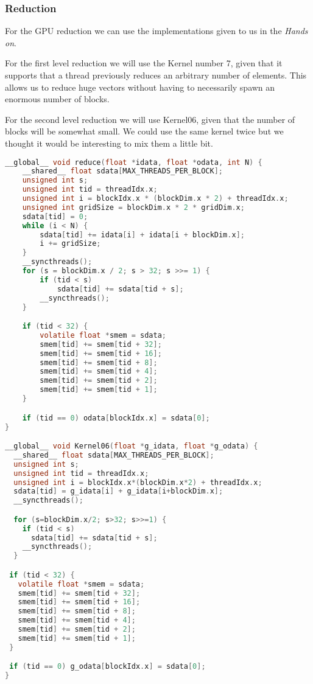 \documentclass[a4paper, 10pt]{article}
\begin{document}
\subsubsection{Reduction}

For the GPU reduction we can use the implementations given to us in the \textit{Hands on}. 

For the first level reduction we will use the Kernel number 7, given that it supports that a thread previously reduces an arbitrary number of elements. This allows us to reduce huge vectors without having to necessarily spawn an enormous number of blocks.

For the second level reduction we will use Kernel06, given that the number of blocks will be somewhat small. We could use the same kernel twice but we thought it would be interesting to mix them a little bit.

\begin{lstlisting}[language=c, caption={Reduction kernel}]
__global__ void reduce(float *idata, float *odata, int N) {
    __shared__ float sdata[MAX_THREADS_PER_BLOCK];
    unsigned int s;
    unsigned int tid = threadIdx.x;
    unsigned int i = blockIdx.x * (blockDim.x * 2) + threadIdx.x;
    unsigned int gridSize = blockDim.x * 2 * gridDim.x;
    sdata[tid] = 0;
    while (i < N) {
        sdata[tid] += idata[i] + idata[i + blockDim.x];
        i += gridSize;
    }
    __syncthreads();
    for (s = blockDim.x / 2; s > 32; s >>= 1) {
        if (tid < s)
            sdata[tid] += sdata[tid + s];
        __syncthreads();
    }

    if (tid < 32) {
        volatile float *smem = sdata;
        smem[tid] += smem[tid + 32];
        smem[tid] += smem[tid + 16];
        smem[tid] += smem[tid + 8];
        smem[tid] += smem[tid + 4];
        smem[tid] += smem[tid + 2];
        smem[tid] += smem[tid + 1];
    }

    if (tid == 0) odata[blockIdx.x] = sdata[0];
}

__global__ void Kernel06(float *g_idata, float *g_odata) {
  __shared__ float sdata[MAX_THREADS_PER_BLOCK];
  unsigned int s;
  unsigned int tid = threadIdx.x;
  unsigned int i = blockIdx.x*(blockDim.x*2) + threadIdx.x;
  sdata[tid] = g_idata[i] + g_idata[i+blockDim.x];
  __syncthreads();

  for (s=blockDim.x/2; s>32; s>>=1) {
    if (tid < s)
      sdata[tid] += sdata[tid + s];
    __syncthreads();
  }

 if (tid < 32) {
   volatile float *smem = sdata;
   smem[tid] += smem[tid + 32];
   smem[tid] += smem[tid + 16];
   smem[tid] += smem[tid + 8];
   smem[tid] += smem[tid + 4];
   smem[tid] += smem[tid + 2];
   smem[tid] += smem[tid + 1];
 }

 if (tid == 0) g_odata[blockIdx.x] = sdata[0];
}


\end{lstlisting}
\end{document}

